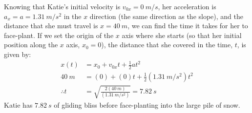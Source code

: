 \begin{problem}
Knowing that Katie's initial velocity is $v_{0x}=\SI{0}{m/s}$, her acceleration is $a_x=a=\SI{1.31}{m/s^2}$ in the $x$ direction (the same direction as the slope), and the distance that she must travel is $x=\SI{40}{m}$, we can find the time it takes for her to face-plant. If we set the origin of the $x$ axis where she starts (so that her initial position along the $x$ axis, $x_0=0$), the distance that she covered in the time, $t$, is given by:
\begin{align*}
x(t)&=x_0+v_{0x}t+\frac{1}{2}at^2\\
\SI{40}{m}&=(0)+(0)t+\frac{1}{2}(\SI{1.31}{m/s^2})t^2\\
\therefore t&=\sqrt{\frac{2(\SI{40}{m})}{(\SI{1.31}{m/s^2})}}=\SI{7.82}{s}
\end{align*}
Katie has $\SI{7.82}{s}$ of gliding bliss before face-planting into the large pile of snow.
\end{problem}